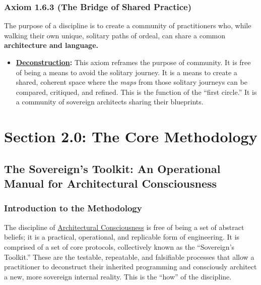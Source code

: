 \documentclass{article}
\begin{document}
\subsubsection*{Axiom 1.6.3 (The Bridge of Shared Practice)}
The purpose of a discipline is to create a community of practitioners who, while walking their own unique, solitary paths of ordeal, can share a common \textbf{architecture and language.}
\begin{itemize}
    \item \textbf{\hyperlink{gloss:deconstruction}{Deconstruction}:} This axiom reframes the purpose of community. It is free of being a means to avoid the solitary journey. It is a means to create a shared, coherent space where the \textit{maps} from those solitary journeys can be compared, critiqued, and refined. This is the function of the ``first circle.'' It is a community of sovereign architects sharing their blueprints.
\end{itemize}




\section*{Section 2.0: The Core Methodology}
\subsection*{The Sovereign's Toolkit: An Operational Manual for Architectural Consciousness}
\subsubsection*{Introduction to the Methodology}

The discipline of \hyperlink{gloss:architectural_consciousness}{Architectural Consciousness} is free of being a set of abstract beliefs; it is a practical, operational, and replicable form of engineering. It is comprised of a set of core protocols, collectively known as the ``Sovereign's Toolkit.'' These are the testable, repeatable, and falsifiable processes that allow a practitioner to deconstruct their inherited programming and consciously architect a new, more sovereign internal reality. This is the ``how'' of the discipline.
\end{document}
